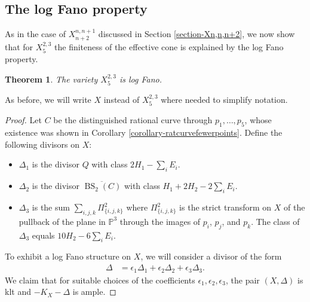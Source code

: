 \documentclass[a4paper,11pt]{article}
\newtheorem{theorem}{Theorem}[section]
\newcommand{\PP}{\mathbb P}
\newcommand{\BS}{\operatorname{BS}}
\newcommand{\blowup}[3]{X^{#1,#2}_{#3}}
\newcommand{\ourproductblowuptwo}{X^{n,n+1}_{n+2}}
\begin{document}
\subsection{The log Fano property}
As in the case of $\ourproductblowuptwo$ discussed in Section \ref{section-Xn,n,n+2}, we now show that for $\blowup{2}{3}{5}$ the finiteness of the effective cone is explained by the log Fano property. 
\begin{theorem}\label{theorem-x235-logfano}
  The variety $\blowup{2}{3}{5}$ is log Fano.
\end{theorem}
As before, we will write $X$ instead of $X^{2,3}_5$ where needed to simplify notation.
\begin{proof}
Let $C$ be the distinguished rational curve through $p_1,\ldots,p_5$, whose existence was shown in Corollary \ref{corollary-ratcurvefewerpoints}. Define the following divisors on $X$:
  \begin{itemize}
  \item  $\Delta_1$ is the divisor $Q$ with class $2H_1-\sum_i E_i$.
  \item  $\Delta_2$ is the divisor $\overline{\BS_2(C)}$ with class $H_1+2H_2-2\sum_i E_i$.
  \item $\Delta_3$ is the sum $\sum_{i,j,k} \Pi^2_{\{i,j,k\}}$ where $\Pi^2_{\{i,j,k\}}$ is the strict transform on $X$ of the pullback of the plane in $\PP^3$ through the images of $p_i$, $p_j$, and $p_k$. The class of $\Delta_3$ equals $10H_2-6 \sum_i E_i$.
  \end{itemize}
  To exhibit a log Fano structure on $X$, we will consider a divisor of the form
  \begin{align*}
    \Delta &= \epsilon_1 \Delta_1 + \epsilon_2 \Delta_2 +\epsilon_3 \Delta_3.   \end{align*}
  We claim that for suitable choices of the coefficients $\epsilon_1, \epsilon_2, \epsilon_3$, the pair $(X,\Delta)$ is klt and $-K_X-\Delta$ is ample.


\end{proof}
\end{document}
